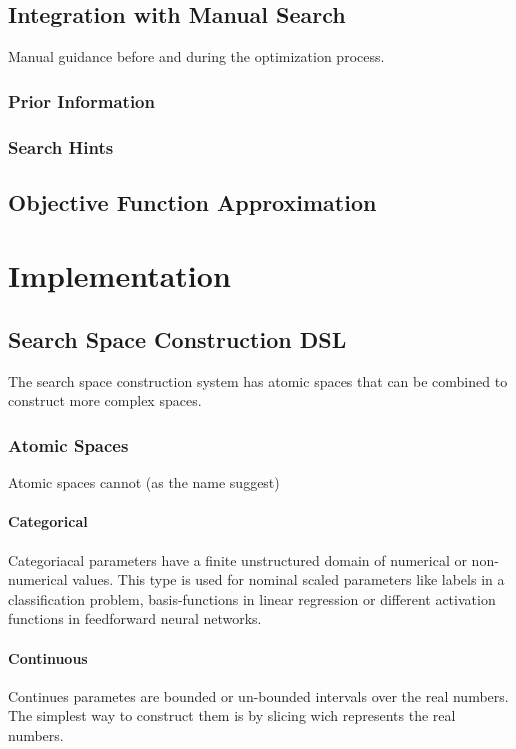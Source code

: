 \documentclass[english]{article}
\begin{document}
\begin{definition}[Topology]
\subsection{Integration with Manual Search}
Manual guidance before and during the optimization process.

\subsubsection{Prior Information}
\subsubsection{Search Hints}
\subsection{Objective Function Approximation}


\section{Implementation}
\subsection{Search Space Construction DSL}
The search space construction system has atomic spaces that can
be combined to construct more complex spaces.

\subsubsection{Atomic Spaces}
Atomic spaces cannot (as the name suggest)

\paragraph{Categorical}
Categoriacal parameters have a finite unstructured domain of numerical or non-numerical values. This type is used for nominal scaled parameters like labels in a classification problem, basis-functions in linear regression or different activation functions in feedforward neural networks.

\paragraph{Continuous}
Continues parametes are bounded or un-bounded intervals over the real numbers. The simplest way to construct them is by slicing wich represents the real numbers.


\end{definition}
\end{document}
